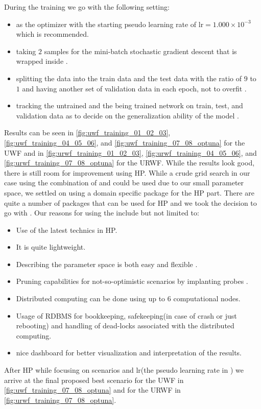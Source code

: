 During the training we go with the following setting:
\begin{itemize}
  \item \adam\cite{Kingma2014}\index{\adam} as the optimizer with the starting pseudo learning rate of $\mathrm{lr}=1.000\times10^{-3}$ which is recommended\cite{Kingma2014}\cite{Sun2019}.
  \item taking $2$ samples for the mini-batch stochastic gradient descent that is wrapped inside \adam\cite{Kingma2014}\index{\adam}.
  \item splitting the data into the train data and the test data with the ratio of $9$ to $1$ and having another set of 
  validation data in each epoch, not to overfit \cite{Chollet2023}.
  \item tracking the untrained and the being trained network on train, test, and validation data as to decide on the generalization ability of the model \cite{Chollet2023}.
\end{itemize}
Results can be seen in \cref{fig:uwf_training_01_02_03}, \ref{fig:uwf_training_04_05_06}, and \ref{fig:uwf_training_07_08_optuna} for the 
\ac{UWF} and in \cref{fig:urwf_training_01_02_03}, \ref{fig:urwf_training_04_05_06}, and \ref{fig:urwf_training_07_08_optuna} 
for the \ac{URWF}. While the results look good, there is still room for improvement using \ac{HP}\cite{Hutter2019}\cite{Akiba2019}. 
While a crude grid search in our case using the combination of \bash\cite{Ramey2022}\index{\bash} and \awk\cite{Robbins2023}\index{\awk} could be used due to our small parameter space, we settled on 
using a domain specific package for the \ac{HP}\cite{Hutter2019}\cite{Akiba2019} part. There are quite a number of packages that can be used for \ac{HP}\cite{Hutter2019}\cite{Akiba2019} and we took the decision to go with 
\optuna\cite{Akiba2019}\index{\optuna}. Our reasons for using the \optuna\cite{Akiba2019}\index{\optuna} include but not limited to:
\begin{itemize}
  \item Use of the latest technics in \ac{HP}\cite{Hutter2019}\cite{Akiba2019}.
  \item It is quite lightweight.
  \item Describing the parameter space is both easy and flexible \cite{Akiba2019}.
  \item Pruning capabilities for not-so-optimistic scenarios by implanting probes \cite{Akiba2019}.
  \item Distributed computing can be done using up to 6 computational nodes.
  \item Usage of \ac{RDBMS} for bookkeeping, safekeeping(in case of crash or just rebooting) and handling of dead-locks associated with the distributed computing.
  \item nice dashboard for better visualization and interpretation of the results.  
\end{itemize}
After \ac{HP}\cite{Hutter2019}\cite{Akiba2019} while focusing on scenarios and $\mathrm{lr}$(the pseudo learning rate in \adam) we arrive at the final proposed best scenario for the \ac{UWF} in 
\cref{fig:uwf_training_07_08_optuna} and for the \ac{URWF} in \cref{fig:urwf_training_07_08_optuna}.

